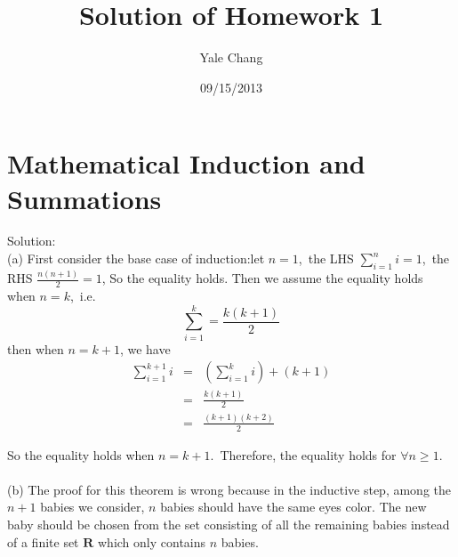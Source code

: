 \documentclass[11pt]{article}
\title{\textbf{Solution of Homework 1}}
\author{Yale Chang}
\date{09/15/2013}
\begin{document}
\maketitle

\section{Mathematical Induction and Summations}
Solution:\\
(a) First consider the base case of induction:let $n=1$,~the LHS $\sum_{i=1}^ni=1$,~the RHS $\frac{n(n+1)}{2}=1$, So the equality holds.
Then we assume the equality holds when $n=k$,~i.e.
\begin{equation*}
\sum_{i=1}^k=\frac{k(k+1)}{2}
\end{equation*}
then when $n=k+1$, we have
\begin{displaymath}
\begin{array}{lcl}
\sum_{i=1}^{k+1}i &=& (\sum_{i=1}^{k}i)+(k+1)\\
				  &=& \frac{k(k+1)}{2}\\
				  &=& \frac{(k+1)(k+2)}{2}
\end{array}
\end{displaymath}

So the equality holds when $n=k+1$.~Therefore, the equality holds for $\forall n\geq 1$.\\
\\
(b) The proof for this theorem is wrong because in the inductive step, among the $n+1$ babies we consider, $n$ babies should have the same eyes color. The new baby should be chosen from the set consisting of all the remaining babies instead of a finite set $\mathbf{R}$ which only contains $n$ babies. 
\end{document}
